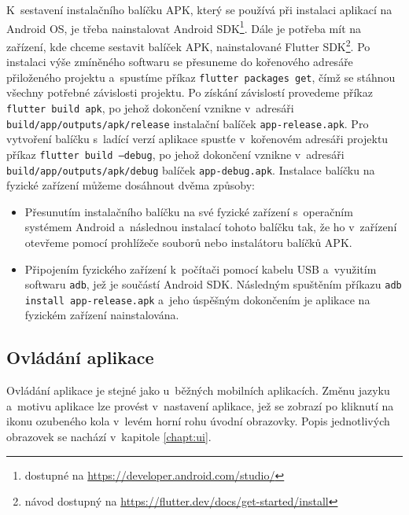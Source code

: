 \documentclass[12pt, a4paper]{article}
\begin{document}
K~sestavení instalačního balíčku APK, který se používá při instalaci aplikací na Android OS, je třeba nainstalovat Android SDK\footnote{dostupné na \url{https://developer.android.com/studio/}}. Dále je potřeba mít na zařízení, kde chceme sestavit balíček APK, nainstalované Flutter SDK\footnote{návod dostupný na \url{https://flutter.dev/docs/get-started/install}}. Po instalaci výše zmíněného softwaru se přesuneme do kořenového adresáře přiloženého projektu a~spustíme příkaz \texttt{flutter packages get}, čímž se stáhnou všechny potřebné závislosti projektu. Po získání závislostí provedeme příkaz \texttt{flutter build apk}, po jehož dokončení vznikne v~adresáři \texttt{build/app/outputs/apk/release} instalační balíček \texttt{app-release.apk}. Pro vytvoření balíčku s~ladící verzí aplikace spustťe v~kořenovém adresáři projektu příkaz \texttt{flutter build --debug}, po jehož dokončení vznikne v~adresáři \texttt{build/app/outputs/apk/debug} balíček \texttt{app-debug.apk}. Instalace balíčku na fyzické zařízení můžeme dosáhnout dvěma způsoby:

\begin{itemize}
        \item Přesunutím instalačního balíčku na své fyzické zařízení s~operačním systémem Android a~následnou instalací tohoto balíčku tak, že ho v~zařízení otevřeme pomocí prohlížeče souborů nebo instalátoru balíčků APK.
        \item Připojením fyzického zařízení k~počítači pomocí kabelu USB a~využitím softwaru \texttt{adb}, jež je součástí Android SDK. Následným spuštěním příkazu \texttt{adb install app-release.apk} a~jeho úspěšným dokončením je aplikace na fyzickém zařízení nainstalována.
\end{itemize}

\subsection{Ovládání aplikace}

Ovládání aplikace je stejné jako u~běžných mobilních aplikacích. Změnu jazyku a~motivu aplikace lze provést v~nastavení aplikace, jež se zobrazí po kliknutí na ikonu ozubeného kola v~levém horní rohu úvodní obrazovky. Popis jednotlivých obrazovek se nachází v~kapitole \ref{chapt:ui}.




	
	
\end{document}

